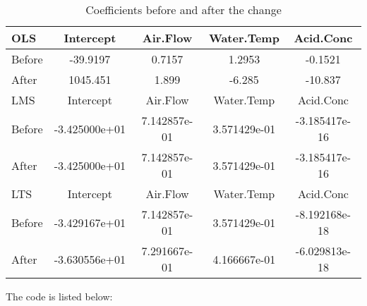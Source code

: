 \documentclass[12pt]{article}
\begin{document}
\begin{table}[!hbp]
  \begin{center}
    \begin{tabular}{|l|c|c|c|c|}
      \hline
      \hline
      OLS    & Intercept & Air.Flow & Water.Temp & Acid.Conc \\ \hline
      Before &  -39.9197 &   0.7157 &     1.2953 & -0.1521   \\ \hline
      After  &  1045.451 &    1.899 &     -6.285 & -10.837   \\ \hline
      \hline
      LMS    & Intercept & Air.Flow & Water.Temp & Acid.Conc \\ \hline
      Before & -3.425000e+01 & 7.142857e-01 & 3.571429e-01 &
      -3.185417e-16 \\ \hline 
      After  & -3.425000e+01 & 7.142857e-01 & 3.571429e-01 &
      -3.185417e-16  \\ \hline 
      \hline
      LTS    & Intercept & Air.Flow & Water.Temp & Acid.Conc \\ \hline
      Before & -3.429167e+01 & 7.142857e-01 & 3.571429e-01 &
      -8.192168e-18 \\ \hline
      After  & -3.630556e+01 & 7.291667e-01 & 4.166667e-01 &
      -6.029813e-18 \\ \hline
      \hline
    \end{tabular}
  \end{center}
  \caption{Coefficients before and after the change \label{tab:q3}}
\end{table}

\appendix
\appendixpage
\addappheadtotoc

The code is listed below:


\end{document}
